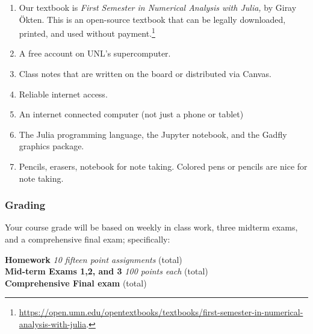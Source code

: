 \documentclass[12pt,fullpage]{article}
\newcounter{ex}\setcounter{ex}{0}
\newenvironment{mypar}[2]
  {\begin{list}{}%
    {\setlength\leftmargin{#1}
    \setlength\rightmargin{#2}}
    \item[]}
  {\end{list}}
\begin{document}
\begin{enumerate}

\item Our textbook is \emph{First Semester in Numerical Analysis with Julia,} by Giray Ökten.  This is an open-source 
textbook that can be legally downloaded, printed, and  used without 
payment.\footnote{\tiny \url{https://open.umn.edu/opentextbooks/textbooks/first-semester-in-numerical-analysis-with-julia}.  \normalsize} 

\item A free account on UNL's supercomputer.

\item Class notes that are written on the board or distributed via Canvas.

\item Reliable internet access.

\item  An internet connected computer (not just a phone or tablet) 

\item The Julia programming language, the Jupyter notebook, and the Gadfly
      graphics package.

\item Pencils, erasers, notebook for note taking. Colored pens or pencils are nice 
for note taking.


 \end{enumerate}


\subsubsection*{Grading}
 Your course grade will be based on weekly in class work, three midterm exams, and a 
 comprehensive 
 final exam; specifically:
 \begin{mypar}{0.25in}{0.25in}
       \textbf{Homework}  \emph{10 fifteen point assignments}   (total) \\
       \textbf{Mid-term Exams 1,2, and 3} \emph{100 points each}  (total)\\
          \textbf{Comprehensive Final exam}  (total)
 \end{mypar}

 
 
 
 
\end{document}
